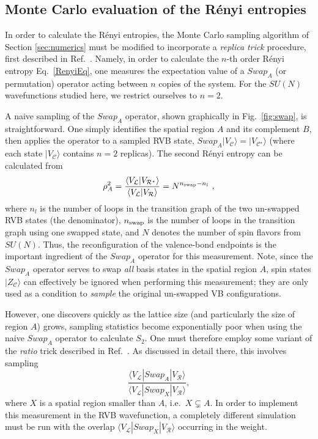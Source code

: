 \documentclass[11pt]{iopart}
\begin{document}
\subsection{Monte Carlo evaluation of the R\'enyi entropies}
\label{sec:su2_numerics}

In order to calculate the R\'enyi entropies, the Monte Carlo sampling algorithm of Section \ref{sec:numerics} must be modified to incorporate
a {\it replica trick} procedure, first described in Ref.~\cite{swap}.  Namely, in order to calculate the $n$-th order R\'enyi entropy Eq.~\ref{RenyiEq}, one measures the expectation value of a $Swap_A$ (or permutation) operator acting between $n$ copies of the system.  For the $SU(N)$ wavefunctions studied here, we restrict ourselves to $n=2$.  

A naive sampling of the $Swap_A$ operator, shown graphically in Fig.~\ref{fig:swap}, is straightforward.  One simply identifies the spatial region $A$ and its complement $B$, then applies the operator to a sampled RVB state, $Swap_A |V_{\mathcal C} \rangle =  |V_{\mathcal C^{\star}} \rangle$ (where each state $|V_{\mathcal C} \rangle$ contains $n=2$ replicas).  The second R\'enyi entropy can be calculated from \cite{swap}
\begin{equation}
	\rho_A^2
		= \frac{\langle V_{\mathcal{L}} | V_{\mathcal{R}^{\star}} \rangle}
			{\langle V_{\mathcal{L}} | V_{\mathcal{R}} \rangle} 
			 = N^{n_{\rm swap} - n_l}\ ,
\end{equation}
where $n_l$ is the number of loops in the transition graph of the two un-swapped RVB states (the denominator), $n_{\rm swap}$ is the number of loops in the transition graph using one swapped state, and $N$ denotes the number of spin flavors from $SU(N)$.  
Thus, the reconfiguration of the valence-bond endpoints is the important ingredient of the $Swap_A$ operator for this measurement.  Note, 
since the $Swap_A$ operator serves to swap {\it all} basis states in the spatial region $A$, spin states $|Z_{\mathcal C} \rangle$ can effectively be ignored when performing this measurement; they are only used as a condition to {\it sample} the original un-swapped VB configurations.

However, one discovers quickly as the lattice size (and particularly the size of region $A$) grows, sampling statistics become exponentially poor when using the naive $Swap_A$ operator to calculate $S_2$.  One must therefore employ some variant of the {\it ratio} trick described in  Ref.~\cite{swap}.  As discussed in detail there, this involves sampling 
\begin{equation}
 \frac{\langle V_{\mathcal{L}} | Swap_A | V_{\mathcal{R}} \rangle}
			{\langle V_{\mathcal{L}} | Swap_X | V_{\mathcal{R}} \rangle},
\end{equation}
where $X$ is a spatial region smaller than $A$, i.e.~$X \subsetneq A$.  In order to implement this measurement in the RVB wavefunction, a completely different simulation must be run with the overlap ${\langle V_{\mathcal{L}} | Swap_X | V_{\mathcal{R}} \rangle}$ occurring in the weight.  
\end{document}
